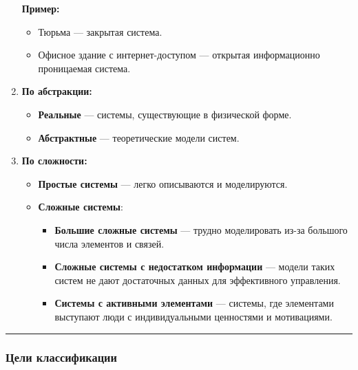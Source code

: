 \documentclass[
]{article}
\providecommand{\tightlist}{%
  \setlength{\itemsep}{0pt}\setlength{\parskip}{0pt}}
\begin{document}
\begin{enumerate}
  \textbf{Пример:}

  \begin{itemize}
  \tightlist
  \item
    Тюрьма --- закрытая система.
  \item
    Офисное здание с интернет-доступом --- открытая информационно
    проницаемая система.
  \end{itemize}
\item
  \textbf{По абстракции:}

  \begin{itemize}
  \tightlist
  \item
    \textbf{Реальные} --- системы, существующие в физической форме.
  \item
    \textbf{Абстрактные} --- теоретические модели систем.
  \end{itemize}
\item
  \textbf{По сложности:}

  \begin{itemize}
  \tightlist
  \item
    \textbf{Простые системы} --- легко описываются и моделируются.
  \item
    \textbf{Сложные системы}:

    \begin{itemize}
    \tightlist
    \item
      \textbf{Большие сложные системы} --- трудно моделировать из-за
      большого числа элементов и связей.
    \item
      \textbf{Сложные системы с недостатком информации} --- модели таких
      систем не дают достаточных данных для эффективного управления.
    \item
      \textbf{Системы с активными элементами} --- системы, где
      элементами выступают люди с индивидуальными ценностями и
      мотивациями.
    \end{itemize}
  \end{itemize}
\end{enumerate}

\begin{center}\rule{0.5\linewidth}{0.5pt}\end{center}

\subsubsection{\texorpdfstring{\textbf{Цели
классификации}}{Цели классификации}}\label{ux446ux435ux43bux438-ux43aux43bux430ux441ux441ux438ux444ux438ux43aux430ux446ux438ux438}
\end{document}
